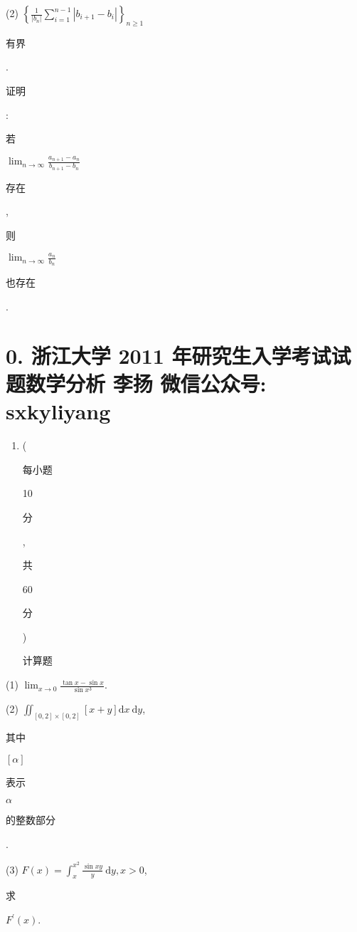 \documentclass[10pt]{article}
\begin{document}
(2) $\left\{\frac{1}{\left|b_{n}\right|} \sum_{i=1}^{n-1}\left|b_{i+1}-b_{i}\right|\right\}_{n \geqslant 1}$ \begin{CJK}{UTF8}{mj}有界\end{CJK}.

\begin{CJK}{UTF8}{mj}证明\end{CJK}: \begin{CJK}{UTF8}{mj}若\end{CJK} $\lim _{n \rightarrow \infty} \frac{a_{n+1}-a_{n}}{b_{n+1}-b_{n}}$ \begin{CJK}{UTF8}{mj}存在\end{CJK}, \begin{CJK}{UTF8}{mj}则\end{CJK} $\lim _{n \rightarrow \infty} \frac{a_{n}}{b_{n}}$ \begin{CJK}{UTF8}{mj}也存在\end{CJK}.

\section{0. 浙江大学 2011 年研究生入学考试试题数学分析 
 李扬 
 微信公众号: sxkyliyang}
\begin{enumerate}
  \item (\begin{CJK}{UTF8}{mj}每小题\end{CJK} 10 \begin{CJK}{UTF8}{mj}分\end{CJK}, \begin{CJK}{UTF8}{mj}共\end{CJK} 60 \begin{CJK}{UTF8}{mj}分\end{CJK}) \begin{CJK}{UTF8}{mj}计算题\end{CJK}
\end{enumerate}
(1) $\lim _{x \rightarrow 0} \frac{\tan x-\sin x}{\sin x^{3}}$.

(2) $\iint_{[0,2] \times[0,2]}[x+y] \mathrm{d} x \mathrm{~d} y$, \begin{CJK}{UTF8}{mj}其中\end{CJK} $[\alpha]$ \begin{CJK}{UTF8}{mj}表示\end{CJK} $\alpha$ \begin{CJK}{UTF8}{mj}的整数部分\end{CJK}.

(3) $F(x)=\int_{x}^{x^{2}} \frac{\sin x y}{y} \mathrm{~d} y, x>0$, \begin{CJK}{UTF8}{mj}求\end{CJK} $F^{\prime}(x)$.
\end{document}
